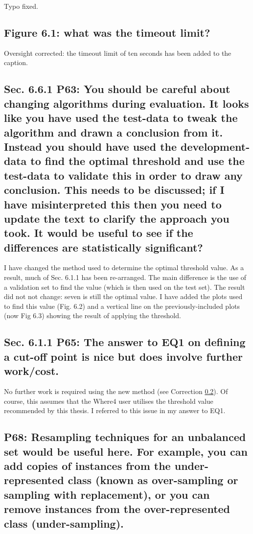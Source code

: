\documentclass[]{article}
\begin{document}
Typo fixed.

\subsection{Figure 6.1: what was the timeout limit?}

Oversight corrected: the timeout limit of ten seconds has been added to the caption.

\subsection{Sec. 6.6.1 P63: You should be careful about changing algorithms during evaluation. It looks like you have used the test-data to tweak the algorithm and drawn a conclusion from it. Instead you should have used the development-data to find the optimal threshold and use the test-data to validate this in order to draw any conclusion. This needs to be discussed; if I have	misinterpreted this then you need to update the text to clarify the approach you took. It would be useful to see if the differences are statistically significant?}
\label{threshold}

I have changed the method used to determine the optimal threshold value.
As a result, much of Sec. 6.1.1 has been re-arranged.
The main difference is the use of a validation set to find the value (which is then used on the test set). 
The result did not not change: seven is still the optimal value. 
I have added the plots used to find this value (Fig. 6.2) and a vertical line on the previously-included plots (now Fig 6.3) showing the result of applying the threshold.

\subsection{Sec. 6.1.1 P65: The answer to EQ1 on defining a cut-off point is nice but does involve further work/cost.}

No further work is required using the new method (see Correction \ref{threshold}).
Of course, this assumes that the \textsf{Where4} user utilises the threshold value recommended by this thesis.
I referred to this issue in my answer to EQ1.

\subsection{P68: Resampling techniques for an unbalanced set would be useful here. For example, you can add copies of instances from the under-represented class (known as over-sampling or sampling with replacement), or you can remove instances from the over-represented class (under-sampling).}
\end{document}
